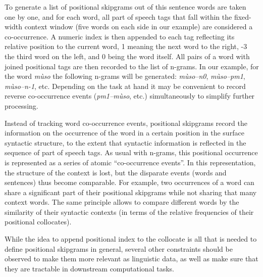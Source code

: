 \documentclass[12pt]{article}
\begin{document}
To generate a list of positional skipgrams out of this sentence words
are taken one by one, and for each word, all part of speech tags that
fall within the fixed-width context window (five words on each side in
our example) are considered a co-occurrence. A numeric index is
then appended to each tag reflecting its relative position to the
current word, 1 meaning the next word to the right, -3 the third word
on the left, and 0 being the word itself. All pairs of a word with 
joined positional tags are then recorded to the list of n-grams. In our
example, for the word \textit{mùso} the following n-grams will be
generated: \textit{mùso--n0}, \textit{mùso--pm1}, \textit{mùso--n-1}, etc.
Depending on the task at hand it may be convenient to record reverse
co-occurrence events (\textit{pm1--mùso}, etc.) simultaneously to simplify
further processing. 

Instead of tracking word co-occurrence events, positional skipgrams
record the information on the occurrence of the word in a certain
position in the surface syntactic structure, to the extent that
syntactic information is reflected in the sequence of part of speech
tags. As usual with n-grams, this positional occurrence is represented
as a series of atomic “co-occurrence events”. In this representation,
the structure of the context is lost, but the disparate events (words
and sentences) thus become comparable. For example, two occurrences of
a word can share a significant part of their positional skipgrams
while not sharing that many context words. The same principle allows
to compare different words by the similarity of their syntactic
contexts (in terms of the relative frequencies of their positional
collocates).



While the idea to append positional index to the collocate is all that
is needed to define positional skipgrams in general, several other
constraints should be observed to make them more relevant as
linguistic data, as well as make sure that they are tractable in
downstream computational tasks.
\end{document}
